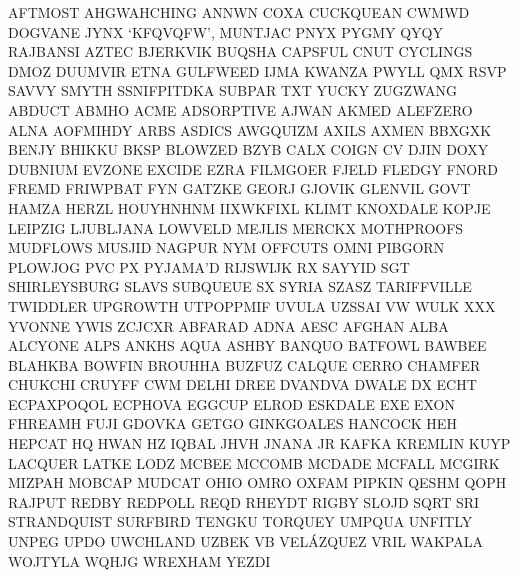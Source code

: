 \documentclass[a4paper,14pt]{memoir}
\begin{document}
AFTMOST AHGWAHCHING ANNWN COXA CUCKQUEAN CWMWD DOGVANE JYNX ‘KFQVQFW’, MUNTJAC PNYX PYGMY QYQY RAJBANSI AZTEC BJERKVIK BUQSHA CAPSFUL CNUT CYCLINGS DMOZ DUUMVIR ETNA GULFWEED IJMA KWANZA PWYLL QMX RSVP SAVVY SMYTH SSNIFPITDKA SUBPAR TXT YUCKY ZUGZWANG ABDUCT ABMHO ACME ADSORPTIVE AJWAN AKMED ALEFZERO ALNA AOFMIHDY ARBS ASDICS AWGQUIZM AXILS AXMEN BBXGXK BENJY BHIKKU BKSP BLOWZED BZYB CALX COIGN CV DJIN DOXY DUBNIUM EVZONE EXCIDE EZRA FILMGOER FJELD FLEDGY FNORD FREMD FRIWPBAT FYN GATZKE GEORJ GJOVIK GLENVIL GOVT HAMZA HERZL HOUYHNHNM IIXWKFIXL KLIMT KNOXDALE KOPJE LEIPZIG LJUBLJANA LOWVELD MEJLIS MERCKX MOTHPROOFS MUDFLOWS MUSJID NAGPUR NYM OFFCUTS OMNI PIBGORN PLOWJOG PVC PX PYJAMA’D RIJSWIJK RX SAYYID SGT SHIRLEYSBURG SLAVS SUBQUEUE SX SYRIA SZASZ TARIFFVILLE TWIDDLER UPGROWTH UTPOPPMIF UVULA UZSSAI VW WULK XXX YVONNE YWIS ZCJCXR ABFARAD ADNA AESC AFGHAN ALBA ALCYONE ALPS ANKHS AQUA ASHBY BANQUO BATFOWL BAWBEE BLAHKBA BOWFIN BROUHHA BUZFUZ CALQUE CERRO CHAMFER CHUKCHI CRUYFF CWM DELHI DREE DVANDVA DWALE DX ECHT ECPAXPOQOL ECPHOVA EGGCUP ELROD ESKDALE EXE EXON FHREAMH FUJI GDOVKA GETGO GINKGOALES HANCOCK HEH HEPCAT HQ HWAN HZ IQBAL JHVH JNANA JR KAFKA KREMLIN KUYP LACQUER LATKE LODZ MCBEE MCCOMB MCDADE MCFALL MCGIRK MIZPAH MOBCAP MUDCAT OHIO OMRO OXFAM PIPKIN QESHM QOPH RAJPUT REDBY REDPOLL REQD RHEYDT RIGBY SLOJD SQRT SRI STRANDQUIST SURFBIRD TENGKU TORQUEY UMPQUA UNFITLY UNPEG UPDO UWCHLAND UZBEK VB VELÁZQUEZ VRIL WAKPALA WOJTYLA WQHJG WREXHAM YEZDI
\end{document}
